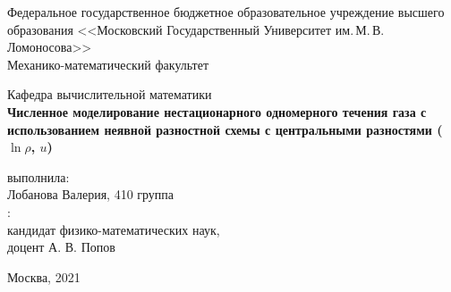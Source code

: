 \begin{titlepage}
	\begin{center}
		Федеральное государственное бюджетное образовательное учреждение высшего образования 
		<<Московский Государственный Университет им.\,М.\,В.\,Ломоносова>>\\

		Механико-математический факультет

		Кафедра вычислительной математики\\[7cm]


		{\bf Численное моделирование нестационарного одномерного течения газа с использованием неявной разностной схемы с центральными разностями ($\ln{\rho}$, $u$)\\[0.5cm]}


		\vspace{6cm}
		\begin{flushright}
			{ выполнила:}\\
			Лобанова Валерия, 410 группа\\[0.5cm]
			{:}\\
			кандидат физико-математических наук,\\
			доцент А. В. Попов\\
		\end{flushright}
		\vspace{5,5cm}

		\normalsize Москва, 2021
	\end{center}
\end{titlepage}
